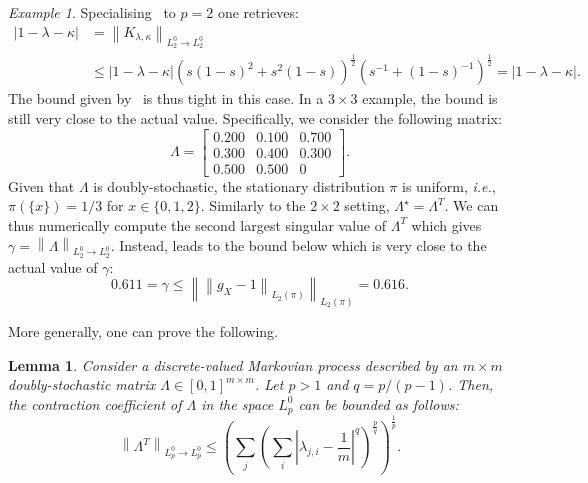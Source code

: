 \documentclass[11pt]{article}
\theoremstyle{plain}
\newtheorem{lemma}[theorem]{Lemma}
\theoremstyle{remark}
\newtheorem{example}{Example}
\begin{document}
\begin{example}
 Specialising~ to $p=2$ one retrieves:
    \begin{align}
        |1-\lambda-\kappa| &= \left\lVert K_{\lambda,\kappa} \right\rVert_{L_2^0 \to L_2^0} \\ &\leq |1-\lambda-\kappa|(s(1-s)^2+s^2(1-s))^\frac{1}{2}(s^{-1}+(1-s)^{-1})^\frac{1}{2}  = |1-\lambda-\kappa|.\label{eq:upperBoundBSC}
    \end{align}  
    The bound given by~ is thus tight in this case.
    In a $3\times 3$ example, the bound is still very close to the actual value. Specifically, we consider the following matrix:
    \begin{equation}
    \Lambda = \begin{bmatrix}
        0.200 & 0.100 & 0.700 \\
        0.300 & 0.400 & 0.300 \\
        0.500 & 0.500 & 0 
        \end{bmatrix}.
        \label{eq:ex3x3} 
\end{equation}
Given that $\Lambda$ is doubly-stochastic, the stationary distribution $\pi$ is uniform, \textit{i.e.}, $\pi(\{x\})=1/3$ for $x\in \{0,1,2\}$. Similarly to the $2\times 2$ setting, $\Lambda^\star = \Lambda^T$. We can thus numerically compute the second largest singular value of $\Lambda^T$ which gives $\gamma=\left\lVert \Lambda \right\rVert_{L_2^0\to L_2^0}$. Instead,  leads to the bound below which is very close to the actual value of $\gamma$:
\begin{equation}
   0.611 = \gamma \leq \left\lVert \left\lVert g_X -1  \right\rVert_{L_2(\pi)} \right\rVert_{L_2(\pi)} =  0.616.
\end{equation}
\end{example}
More generally, one can prove the following.
\begin{lemma}\label{thm:boundmxmDoublyStochastic}
Consider a discrete-valued Markovian process described by an $m\times m$ doubly-stochastic matrix $\Lambda \in [0,1]^{m\times m}$. Let $p>1$ and $q=p/(p-1)$. Then, the contraction coefficient of $\Lambda$ in the space $L_p^0$ can be bounded as follows:
\begin{equation}\label{eq:mbym}
      \left\lVert \Lambda^T \right\rVert_{L_p^0\to L_p^0} %
      \leq \left(\sum_j \left(\sum_i \left|\lambda_{j,i}-\frac{1}{m}\right|^q \right)^\frac{p}{q}\right)^\frac1p.
\end{equation}
\end{lemma}
\end{document}
